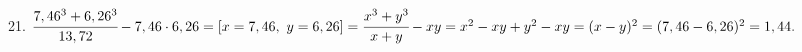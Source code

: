 21. $\cfrac{7,46^3+6,26^3}{13,72}-7,46\cdot 6,26=[x=7,46,\ y=6,26]=\cfrac{x^3+y^3}{x+y}-xy=
x^2-xy+y^2-xy=(x-y)^2=(7,46-6,26)^2=1,44.$\\
